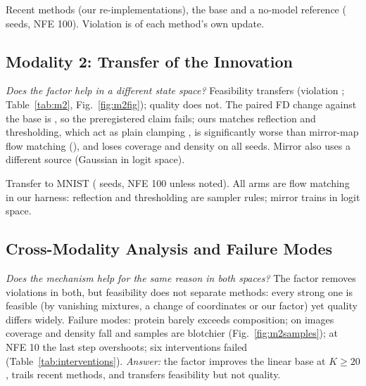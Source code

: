 \documentclass{article}
\begin{document}
\begin{table}[t]
\centering
\caption{Recent methods (our re-implementations), the base and a no-model reference
(\MOneSeeds{} seeds, NFE 100). Violation is of each method's own update.}
\label{tab:baselines}
\footnotesize\begin{adjustbox}{max width=\textwidth}\end{adjustbox}
\end{table}

\subsection{Modality 2: Transfer of the Innovation}
\emph{Does the factor help in a different state space?} Feasibility transfers (violation
\MTwoViolOurs; Table~\ref{tab:m2}, Fig.~\ref{fig:m2fig}); quality does not. The paired FD change
against the base is \MTwoClaim, so the preregistered claim fails; ours matches reflection and
thresholding, which act as plain clamping \citep{lou2023reflected}, is significantly worse than
mirror-map flow matching (\MTwoVsMirror), and loses coverage and density on all \MTwoSeeds{} seeds.
Mirror also uses a different source (Gaussian in logit space).

\begin{table}[t]
\centering
\caption{Transfer to MNIST (\MTwoSeeds{} seeds, NFE 100 unless noted). All arms are flow matching
in our harness: reflection and thresholding are sampler rules; mirror trains in logit space.}
\label{tab:m2}
\footnotesize\begin{adjustbox}{max width=\textwidth}\end{adjustbox}
\end{table}

\subsection{Cross-Modality Analysis and Failure Modes}
\emph{Does the mechanism help for the same reason in both spaces?} The factor removes violations in
both, but feasibility does not separate methods: every strong one is feasible (by vanishing
mixtures, a change of coordinates or our factor) yet quality differs widely. Failure modes: protein
barely exceeds composition; on images coverage and density fall and samples are blotchier
(Fig.~\ref{fig:m2samples}); at NFE 10 the last step overshoots; six interventions failed
(Table~\ref{tab:interventions}). \emph{Answer:} the factor improves the linear base at $K\ge20$,
trails recent methods, and transfers feasibility but not quality.
\end{document}
